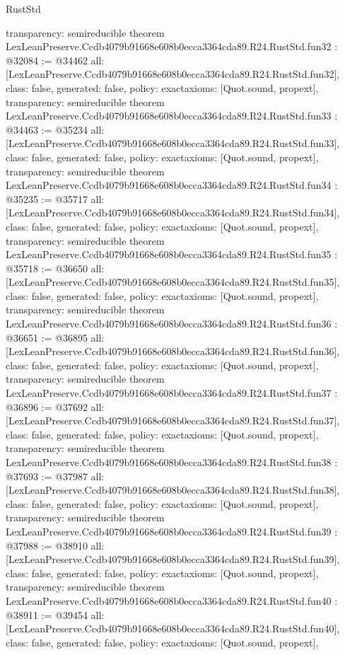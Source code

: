 \begin{lexlean}{RustStd}
\begin{coremodule}
{  transparency: semireducible
}
theorem LexLeanPreserve.Ccdb4079b91668e608b0ecca3364cda89.R24.RustStd.fun32 : @32084 := @34462 {
  all: [LexLeanPreserve.Ccdb4079b91668e608b0ecca3364cda89.R24.RustStd.fun32],
  class: false,
  generated: false,
  policy: exact{axioms: [Quot.sound, propext]},
  transparency: semireducible
}
theorem LexLeanPreserve.Ccdb4079b91668e608b0ecca3364cda89.R24.RustStd.fun33 : @34463 := @35234 {
  all: [LexLeanPreserve.Ccdb4079b91668e608b0ecca3364cda89.R24.RustStd.fun33],
  class: false,
  generated: false,
  policy: exact{axioms: [Quot.sound, propext]},
  transparency: semireducible
}
theorem LexLeanPreserve.Ccdb4079b91668e608b0ecca3364cda89.R24.RustStd.fun34 : @35235 := @35717 {
  all: [LexLeanPreserve.Ccdb4079b91668e608b0ecca3364cda89.R24.RustStd.fun34],
  class: false,
  generated: false,
  policy: exact{axioms: [Quot.sound, propext]},
  transparency: semireducible
}
theorem LexLeanPreserve.Ccdb4079b91668e608b0ecca3364cda89.R24.RustStd.fun35 : @35718 := @36650 {
  all: [LexLeanPreserve.Ccdb4079b91668e608b0ecca3364cda89.R24.RustStd.fun35],
  class: false,
  generated: false,
  policy: exact{axioms: [Quot.sound, propext]},
  transparency: semireducible
}
theorem LexLeanPreserve.Ccdb4079b91668e608b0ecca3364cda89.R24.RustStd.fun36 : @36651 := @36895 {
  all: [LexLeanPreserve.Ccdb4079b91668e608b0ecca3364cda89.R24.RustStd.fun36],
  class: false,
  generated: false,
  policy: exact{axioms: [Quot.sound, propext]},
  transparency: semireducible
}
theorem LexLeanPreserve.Ccdb4079b91668e608b0ecca3364cda89.R24.RustStd.fun37 : @36896 := @37692 {
  all: [LexLeanPreserve.Ccdb4079b91668e608b0ecca3364cda89.R24.RustStd.fun37],
  class: false,
  generated: false,
  policy: exact{axioms: [Quot.sound, propext]},
  transparency: semireducible
}
theorem LexLeanPreserve.Ccdb4079b91668e608b0ecca3364cda89.R24.RustStd.fun38 : @37693 := @37987 {
  all: [LexLeanPreserve.Ccdb4079b91668e608b0ecca3364cda89.R24.RustStd.fun38],
  class: false,
  generated: false,
  policy: exact{axioms: [Quot.sound, propext]},
  transparency: semireducible
}
theorem LexLeanPreserve.Ccdb4079b91668e608b0ecca3364cda89.R24.RustStd.fun39 : @37988 := @38910 {
  all: [LexLeanPreserve.Ccdb4079b91668e608b0ecca3364cda89.R24.RustStd.fun39],
  class: false,
  generated: false,
  policy: exact{axioms: [Quot.sound, propext]},
  transparency: semireducible
}
theorem LexLeanPreserve.Ccdb4079b91668e608b0ecca3364cda89.R24.RustStd.fun40 : @38911 := @39454 {
  all: [LexLeanPreserve.Ccdb4079b91668e608b0ecca3364cda89.R24.RustStd.fun40],
  class: false,
  generated: false,
  policy: exact{axioms: [Quot.sound, propext]},
}
\end{coremodule}
\end{lexlean}
